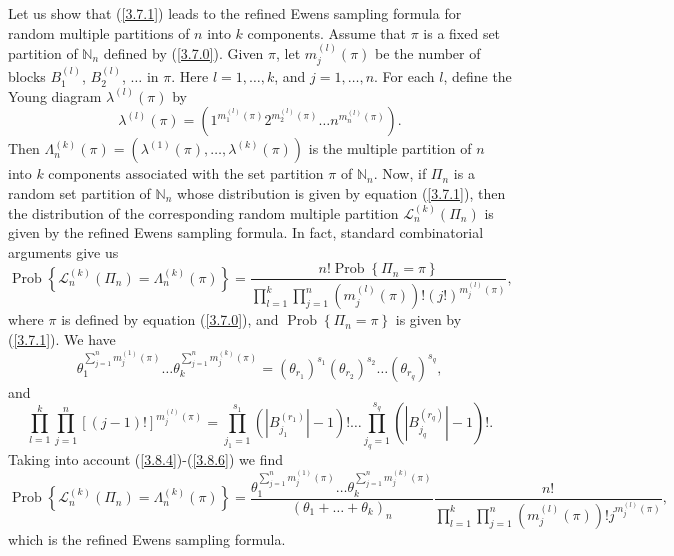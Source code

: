 \documentclass[12pt]{amsart}
\theoremstyle{definition}
\numberwithin{equation}{section}
\DeclareMathOperator{\Prob}{Prob}
\begin{document}
Let us show that (\ref{3.7.1}) leads to the refined Ewens sampling formula for random multiple partitions of $n$ into $k$ components.
Assume that $\pi$ is a fixed set partition of $\mathbb{N}_n$
defined by (\ref{3.7.0}). Given $\pi$, let $m_j^{(l)}(\pi)$
be the number of blocks $B_1^{(l)}$, $B_2^{(l)}$, $\ldots$ in $\pi$.
Here $l=1,\ldots,k$, and $j=1,\ldots, n$. For each $l$, define the
Young diagram $\lambda^{(l)}(\pi)$ by
\begin{equation}\label{3.8.2}
\lambda^{(l)}(\pi)=\left(1^{m_1^{(l)}(\pi)}2^{m_2^{(l)}(\pi)}\ldots
n^{m_n^{(l)}(\pi)}\right).
\end{equation}
Then $\Lambda_n^{(k)}(\pi)=\left(\lambda^{(1)}(\pi),\ldots,\lambda^{(k)}(\pi)\right)$ is the multiple partition of $n$ into $k$ components associated with the set partition $\pi$ of $\mathbb{N}_n$.
Now, if $\Pi_n$ is a random set partition of $\mathbb{N}_n$ whose distribution is given by equation (\ref{3.7.1}), then the distribution of the corresponding random multiple partition $\mathcal{L}_n^{(k)}\left(\Pi_n\right)$ is given by the refined Ewens sampling formula. In fact, standard combinatorial arguments give us
\begin{equation}\label{3.8.4}
\Prob\left\{\mathcal{L}_n^{(k)}\left(\Pi_n\right)=\Lambda_n^{(k)}\left(\pi\right)\right\}=\frac{n!\Prob\left\{\Pi_n=\pi\right\}}{\prod\limits_{l=1}^k\prod\limits_{j=1}^n
\left(m_j^{(l)}(\pi)\right)!\left(j!\right)^{m_j^{(l)}(\pi)}},
\end{equation}
where $\pi$ is defined by equation (\ref{3.7.0}), and
$\Prob\left\{\Pi_n=\pi\right\}$ is given by (\ref{3.7.1}).
We have
\begin{equation}\label{3.8.5}
\theta_1^{\sum\limits_{j=1}^nm_j^{(1)}(\pi)}\ldots
\theta_k^{\sum\limits_{j=1}^nm_j^{(k)}(\pi)}
=(\theta_{r_1})^{s_1}(\theta_{r_2})^{s_2}\ldots(\theta_{r_q})^{s_q},
\end{equation}
and
\begin{equation}\label{3.8.6}
\prod\limits_{l=1}^k\prod\limits_{j=1}^n
\left[(j-1)!\right]^{m_j^{(l)}(\pi)}
=\prod\limits_{j_1=1}^{s_1}\left(|B_{j_1}^{(r_1)}|-1\right)!
\ldots\prod\limits_{j_q=1}^{s_q}\left(|B_{j_q}^{(r_q)}|-1\right)!.
\end{equation}
Taking into account (\ref{3.8.4})-(\ref{3.8.6}) we find
\begin{equation}
\Prob\left\{\mathcal{L}_n^{(k)}\left(\Pi_n\right)=\Lambda_n^{(k)}(\pi)\right\}
=\frac{\theta_1^{\sum\limits_{j=1}^nm_j^{(1)}(\pi)}\ldots
\theta_k^{\sum\limits_{j=1}^nm_j^{(k)}(\pi)}}{\left(\theta_1+\ldots+\theta_k\right)_n}
\frac{n!}{\prod\limits_{l=1}^k\prod\limits_{j=1}^n
\left(m_j^{(l)}(\pi)\right)!j^{m_j^{(l)}(\pi)}},
\end{equation}
which is the refined Ewens sampling formula.
\end{document}
